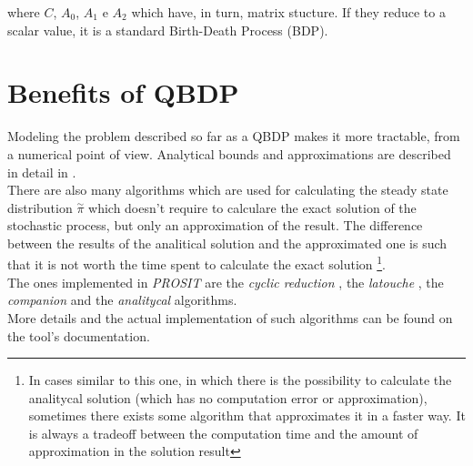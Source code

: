 where \( C \), \( A_{0} \), \( A_{1} \) e \( A_{2} \) which have, in turn, matrix stucture. If they reduce to a scalar value, it is a standard Birth-Death Process (BDP).

\section{Benefits of QBDP}
Modeling the problem described so far as a QBDP makes it more tractable, from a numerical point of view. Analytical bounds and approximations are described in detail in \cite{probGuarantees}.\\
There are also many algorithms which are used for calculating the steady state distribution \( \overset{\sim}{\pi} \) which doesn't require to calculare the exact solution of the stochastic process, but only an approximation of the result. The difference between the results of the analitical solution and the approximated one is such that it is not worth the time spent to calculate the exact solution \footnote{In cases similar to this one, in which there is the possibility to calculate the analitycal solution (which has no computation error or approximation), sometimes there exists some algorithm that approximates it in a faster way. It is always a tradeoff between the computation time and the amount of approximation in the solution result}.\\
The ones implemented in \emph{PROSIT} are the \emph{cyclic reduction} \cite{cyclic}, the \emph{latouche} \cite{latouche}, the \emph{companion} \cite{probGuarantees} and the \emph{analitycal} \cite{probGuarantees} algorithms.\\
More details and the actual implementation of such algorithms can be found on the tool's documentation.